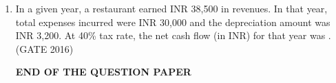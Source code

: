 \documentclass[journal,12pt,onecolumn]{IEEEtran}
\theoremstyle{remark}
\begin{document}
\begin{enumerate}
\begin{multicols}{4}
\begin{enumerate}
    \item 30
    \item 20
    \item 10
    \item 0
\end{enumerate}
\end{multicols}
\vspace{0.5cm}

\item In a given year, a restaurant earned INR 38,500 in revenues. In that year, total expenses incurred were INR 30,000 and the depreciation amount was INR 3,200. At 40\% tax rate, the net cash flow (in INR) for that year was \underline{\hspace{2cm}}.\hfill{(GATE 2016)}
\vspace{5cm}

\textbf{\Large END OF THE QUESTION PAPER}




\end{enumerate}
\end{document}
